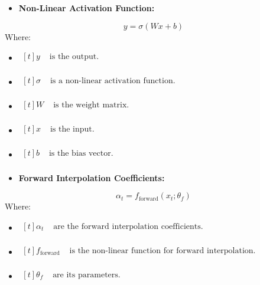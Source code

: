 \documentclass{ieeeojies}
\begin{document}
\begin{itemize}
    \item  \textbf{Non-Linear Activation Function:} 
\end{itemize}
\begin{equation}
y = \sigma(Wx + b)
\end{equation}
Where: 
\begin{itemize}
    \item $\begin{aligned}[t]
            y & \text{ is the output.} \\
            \end{aligned}$
    \item $\begin{aligned}[t]
            \sigma & \text{ is a non-linear activation function.} \\
            \end{aligned}$
    \item $\begin{aligned}[t]
            W & \text{ is the weight matrix.} \\
            \end{aligned}$
    \item $\begin{aligned}[t]
            x & \text{ is the input.} \\
            \end{aligned}$
    \item $\begin{aligned}[t]
            b & \text{ is the bias vector.} \\
            \end{aligned}$
\end{itemize}

\begin{itemize}
    \item  \textbf{Forward Interpolation Coefficients:} 
\end{itemize}
\begin{equation}
\alpha_t = f_{\text{forward}}(x_t; \theta_f)
\end{equation}
Where: 
\begin{itemize}
    \item $\begin{aligned}[t]
            \alpha_t & \text{ are the forward interpolation coefficients.} \\
            \end{aligned}$
    \item $\begin{aligned}[t]
            f_{\text{forward}} & \text{ is the non-linear function for forward interpolation.} \\
            \end{aligned}$
    \item $\begin{aligned}[t]
            \theta_f & \text{ are its parameters.} \\
            \end{aligned}$
\end{itemize}
\end{document}

